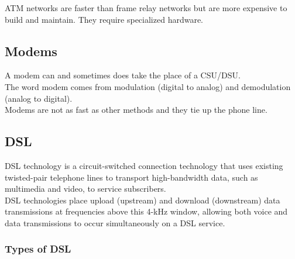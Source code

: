 ATM networks are faster than frame relay networks but are more expensive to
build and maintain. They require specialized hardware.

\subsection{Modems}

A modem can and sometimes does take the place of a CSU/DSU.\\

The word modem comes from modulation (digital to analog) and demodulation
(analog to digital).\\

Modems are not as fast as other methods and they tie up the phone line.

\subsection{DSL}

DSL technology is a circuit-switched connection technology that uses existing
twisted-pair telephone lines to transport high-bandwidth data, such as
multimedia and video, to service subscribers.\\

DSL technologies place upload (upstream) and download (downstream) data
transmissions at frequencies above this 4-kHz window, allowing both voice and
data transmissions to occur simultaneously on a DSL service.

\subsubsection{Types of DSL}

